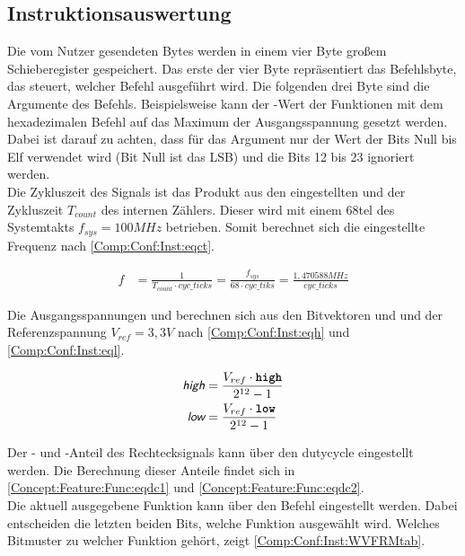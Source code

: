 \subsection{Instruktionsauswertung} \label{Comp:Conf:Inst}
Die vom Nutzer gesendeten Bytes werden in einem vier Byte großem Schieberegister gespeichert.
Das erste der vier Byte repräsentiert das Befehlsbyte, das steuert, welcher Befehl ausgeführt wird.
Die folgenden drei Byte sind die Argumente des Befehls.
Beispielsweise kann der -Wert der Funktionen mit dem hexadezimalen Befehl  auf das Maximum der Ausgangsspannung gesetzt werden.
Dabei ist darauf zu achten, dass für das Argument nur der Wert der Bits Null bis Elf verwendet wird (Bit Null ist das LSB) und die Bits 12 bis 23 ignoriert werden. \\
Die Zykluszeit des Signals ist das Produkt aus den eingestellten  und der Zykluszeit $T_{count}$ des internen Zählers.
Dieser wird mit einem 68tel des Systemtakts $f_{sys} = 100MHz$ betrieben.
Somit berechnet sich die eingestellte Frequenz nach \cref{Comp:Conf:Inst:eqct}.

\begin{align}
  f &= \frac{1}{T_{count} \cdot cyc\_ticks} = \frac{f_{sys}}{68 \cdot cyc\_tiks} = \frac{1,470588 MHz}{cyc\_ticks} \label{Comp:Conf:Inst:eqct}
\end{align}

Die Ausgangsspannungen  und  berechnen sich aus den Bitvektoren  und  und der Referenzspannung $V_{ref} = 3,3 V$ nach \cref{Comp:Conf:Inst:eqh} und \cref{Comp:Conf:Inst:eql}.
  
\begin{align}
  \textsf{\itshape{high}} &= \frac{V_{ref} \cdot \textbf{\texttt{high}}}{2^{12} - 1} \label{Comp:Conf:Inst:eqh} \\
  \textsf{\itshape{low}} &= \frac{V_{ref} \cdot \textbf{\texttt{low}}}{2^{12} - 1} \label{Comp:Conf:Inst:eql}
\end{align}

Der - und -Anteil des Rechtecksignals kann über den dutycycle eingestellt werden.
Die Berechnung dieser Anteile findet sich in \cref{Concept:Feature:Func:eqdc1} und \cref{Concept:Feature:Func:eqdc2}.\\
Die aktuell ausgegebene Funktion kann über den Befehl  eingestellt werden.
Dabei entscheiden die letzten beiden Bits, welche Funktion ausgewählt wird.
Welches Bitmuster zu welcher Funktion gehört, zeigt \cref{Comp:Conf:Inst:WVFRMtab}.

